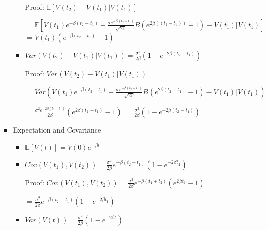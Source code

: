 \documentclass[a4paper]{article}
\begin{document}
\begin{itemize}
\begin{itemize}
\begin{itemize}
\begin{itemize}
                                Proof: $\mathbb{E}[V(t_2) - V(t_1)|V(t_1)]$

                                $= \mathbb{E}[V(t_1) e^{-\beta (t_2 - t_1)} + \frac{\sigma e^{-\beta (t_2 - t_1)}}{\sqrt{2\beta }} B(e^{2\beta ((t_2 - t_1))} - 1) - V(t_1) | V(t_1)]$
                                $= V(t_1) (e^{-\beta (t_2 - t_1)} - 1)$
                            \item $\mathit{Var}(V(t_2) - V(t_1)|V(t_1)) = \frac{\sigma^2}{2\beta} (1 - e^{-2\beta (t_2 - t_1)})$

                                Proof: $\mathit{Var}(V(t_2) - V(t_1)|V(t_1))$

                                $= \mathit{Var}(V(t_1) e^{-\beta (t_2 - t_1)} + \frac{\sigma e^{-\beta (t_2 - t_1)}}{\sqrt{2\beta }} B(e^{2\beta (t_2 - t_1)} - 1) - V(t_1) | V(t_1))$

                                $= \frac{\sigma^2 e^{-2\beta (t_2 - t_1)}}{2\beta} (e^{2\beta (t_2 - t_1)} - 1)$
                                $= \frac{\sigma^2}{2\beta} (1 - e^{-2\beta (t_2 - t_1)})$
                        \end{itemize}
                    \item Expectation and Covariance
                        \begin{itemize}
                            \item $\mathbb{E}[V(t)] = V(0)e^{-\beta t}$
                            \item $\mathit{Cov}(V(t_1), V(t_2)) = \frac{\sigma^2}{2\beta} e^{-\beta(t_2 - t_1)} (1 - e^{-2\beta t_1})$

                                Proof: $\mathit{Cov}(V(t_1), V(t_2)) = \frac{\sigma^2}{2\beta} e^{-\beta(t_1 + t_2)} (e^{2\beta t_1} - 1)$

                                $= \frac{\sigma^2}{2\beta} e^{-\beta(t_2 - t_1)} (1 - e^{-2\beta t_1})$
                            \item $\mathit{Var}(V(t)) = \frac{\sigma^2}{2\beta} (1 - e^{-2\beta t})$
                        \end{itemize}
                \end{itemize}
        \end{itemize}
\end{itemize}
\end{document}
